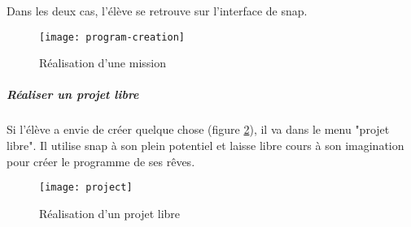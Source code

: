 Dans les deux cas, l'élève se retrouve sur l'interface de \gls{snap}.
\begin{figure}
  \begin{center}
    \texttt{[image: program-creation]}
    \caption{Réalisation d'une mission}
    \label{fig:program-creation}
  \end{center}
\end{figure}

\subparagraph{Réaliser un projet libre} Si l'élève a envie de créer quelque chose (figure \ref{fig:project}), il va dans le menu "projet libre". Il utilise \gls{snap} à son plein potentiel et laisse libre cours à son imagination pour créer le programme de ses rêves.
\begin{figure}
  \begin{center}
    \texttt{[image: project]}
    \caption{Réalisation d'un projet libre}
    \label{fig:project}
  \end{center}
\end{figure}
